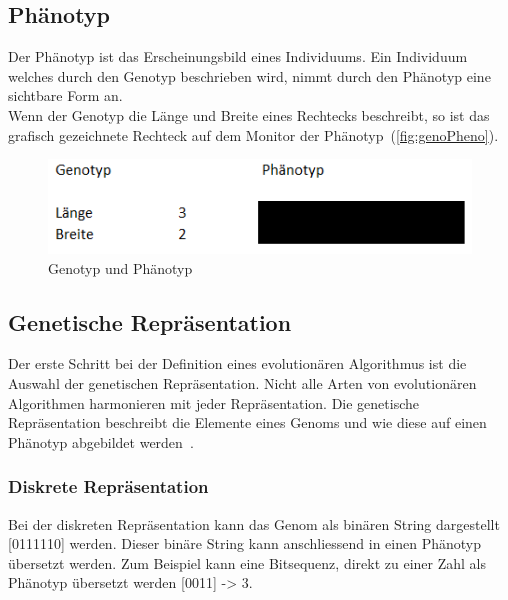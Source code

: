     \subsection{Phänotyp\label{sub:introPhenotyp}}

      Der Phänotyp ist das Erscheinungsbild eines Individuums.
      Ein Individuum welches durch den Genotyp beschrieben wird, nimmt durch den Phänotyp eine sichtbare Form an.
      \\
      Wenn der Genotyp die Länge und Breite eines Rechtecks beschreibt,
      so ist das grafisch gezeichnete Rechteck auf dem Monitor der Phänotyp~(\vref{fig:genoPheno}).

      \begin{figure}[H]
        \includegraphics[scale=1,center]{graphics/genotyp_phenotyp}
        \caption{Genotyp und Phänotyp\label{fig:genoPheno}}
      \end{figure}

    \subsection{Genetische Repräsentation}

      Der erste Schritt bei der Definition eines evolutionären Algorithmus ist die Auswahl der genetischen Repräsentation.
      Nicht alle Arten von evolutionären Algorithmen harmonieren mit jeder Repräsentation.
      Die genetische Repräsentation beschreibt die Elemente eines Genoms und
      wie diese auf einen Phänotyp abgebildet werden~\cite[S.16]{book:bioInspired}.

      \subsubsection{Diskrete Repräsentation\label{subsub:GeneticRepresentationDiscrete}}

        Bei der diskreten Repräsentation kann das Genom als binären String dargestellt [0111110] werden.
        Dieser binäre String kann anschliessend in einen Phänotyp übersetzt werden.
        Zum Beispiel kann eine Bitsequenz, direkt zu einer Zahl als Phänotyp übersetzt werden [0011] -> 3.

        \medskip

